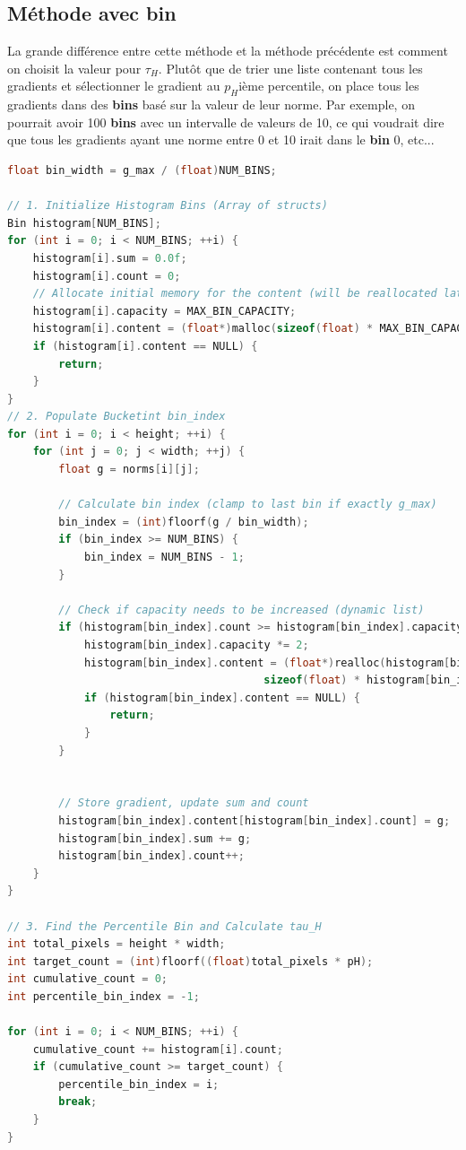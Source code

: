 \documentclass{article}
\begin{document}
\subsection*{Méthode avec \textbf{bin}}
La grande différence entre cette méthode et la méthode précédente est comment on choisit la valeur pour $\tau_H$. Plutôt que de trier une liste
contenant tous les gradients et sélectionner le gradient au $p_H$ième percentile, on place tous les gradients dans des \textbf{bins} basé sur la valeur
de leur norme. Par exemple, on pourrait avoir 100 \textbf{bins} avec un intervalle de valeurs de 10, ce qui voudrait dire que tous les gradients ayant une norme
entre 0 et 10 irait dans le \textbf{bin} 0, etc... 
\begin{lstlisting}[language=C]
float bin_width = g_max / (float)NUM_BINS;
    
// 1. Initialize Histogram Bins (Array of structs)
Bin histogram[NUM_BINS];
for (int i = 0; i < NUM_BINS; ++i) {
    histogram[i].sum = 0.0f;
    histogram[i].count = 0;
    // Allocate initial memory for the content (will be reallocated later)
    histogram[i].capacity = MAX_BIN_CAPACITY;
    histogram[i].content = (float*)malloc(sizeof(float) * MAX_BIN_CAPACITY);
    if (histogram[i].content == NULL) {
        return;
    }
}
// 2. Populate Bucketint bin_index
for (int i = 0; i < height; ++i) {
    for (int j = 0; j < width; ++j) {
        float g = norms[i][j];
            
        // Calculate bin index (clamp to last bin if exactly g_max)
        bin_index = (int)floorf(g / bin_width);
        if (bin_index >= NUM_BINS) {
            bin_index = NUM_BINS - 1; 
        }
            
        // Check if capacity needs to be increased (dynamic list)
        if (histogram[bin_index].count >= histogram[bin_index].capacity) {
            histogram[bin_index].capacity *= 2;
            histogram[bin_index].content = (float*)realloc(histogram[bin_index].content, 
                                        sizeof(float) * histogram[bin_index].capacity);
            if (histogram[bin_index].content == NULL) {
                return;
            }
        }
            

        // Store gradient, update sum and count
        histogram[bin_index].content[histogram[bin_index].count] = g;
        histogram[bin_index].sum += g;
        histogram[bin_index].count++;
    }
}

// 3. Find the Percentile Bin and Calculate tau_H
int total_pixels = height * width;
int target_count = (int)floorf((float)total_pixels * pH);
int cumulative_count = 0;
int percentile_bin_index = -1;

for (int i = 0; i < NUM_BINS; ++i) {
    cumulative_count += histogram[i].count;
    if (cumulative_count >= target_count) {
        percentile_bin_index = i;
        break;
    }
}
\end{lstlisting}
\end{document}
